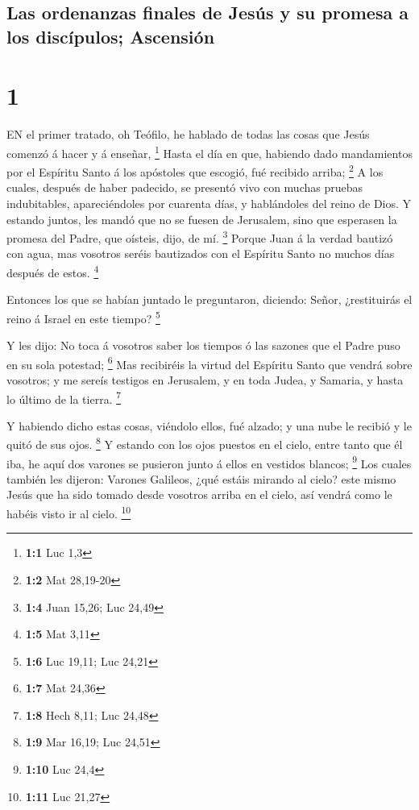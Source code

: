 \hypertarget{las-ordenanzas-finales-de-jesuxfas-y-su-promesa-a-los-discuxedpulos-ascensiuxf3n}{%
\subsection{Las ordenanzas finales de Jesús y su promesa a los
discípulos;
Ascensión}\label{las-ordenanzas-finales-de-jesuxfas-y-su-promesa-a-los-discuxedpulos-ascensiuxf3n}}

\hypertarget{section}{%
\section{1}\label{section}}

 EN el primer tratado, oh Teófilo, he hablado de todas las
cosas que Jesús comenzó á hacer y á enseñar, \footnote{\textbf{1:1} Luc
  1,3}  Hasta el día en que, habiendo dado mandamientos por
el Espíritu Santo á los apóstoles que escogió, fué recibido arriba;
\footnote{\textbf{1:2} Mat 28,19-20}  A los cuales, después
de haber padecido, se presentó vivo con muchas pruebas indubitables,
apareciéndoles por cuarenta días, y hablándoles del reino de Dios.
 Y estando juntos, les mandó que no se fuesen de Jerusalem,
sino que esperasen la promesa del Padre, que oísteis, dijo, de mí.
\footnote{\textbf{1:4} Juan 15,26; Luc 24,49}  Porque Juan á
la verdad bautizó con agua, mas vosotros seréis bautizados con el
Espíritu Santo no muchos días después de estos. \footnote{\textbf{1:5}
  Mat 3,11}

 Entonces los que se habían juntado le preguntaron,
diciendo: Señor, ¿restituirás el reino á Israel en este tiempo?
\footnote{\textbf{1:6} Luc 19,11; Luc 24,21}

 Y les dijo: No toca á vosotros saber los tiempos ó las
sazones que el Padre puso en su sola potestad; \footnote{\textbf{1:7}
  Mat 24,36}  Mas recibiréis la virtud del Espíritu Santo
que vendrá sobre vosotros; y me sereís testigos en Jerusalem, y en toda
Judea, y Samaria, y hasta lo último de la tierra. \footnote{\textbf{1:8}
  Hech 8,11; Luc 24,48}

 Y habiendo dicho estas cosas, viéndolo ellos, fué alzado; y
una nube le recibió y le quitó de sus ojos. \footnote{\textbf{1:9} Mar
  16,19; Luc 24,51}  Y estando con los ojos puestos en el
cielo, entre tanto que él iba, he aquí dos varones se pusieron junto á
ellos en vestidos blancos; \footnote{\textbf{1:10} Luc 24,4}
 Los cuales también les dijeron: Varones Galileos, ¿qué
estáis mirando al cielo? este mismo Jesús que ha sido tomado desde
vosotros arriba en el cielo, así vendrá como le habéis visto ir al
cielo. \footnote{\textbf{1:11} Luc 21,27}


